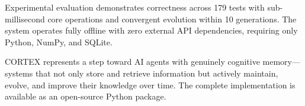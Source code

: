 \documentclass[runningheads]{llncs}
\begin{document}
Experimental evaluation demonstrates correctness across 179 tests with sub-millisecond core operations and convergent evolution within 10 generations. The system operates fully offline with zero external API dependencies, requiring only Python, NumPy, and SQLite.

CORTEX represents a step toward AI agents with genuinely cognitive memory---systems that not only store and retrieve information but actively maintain, evolve, and improve their knowledge over time. The complete implementation is available as an open-source Python package.



\end{document}
